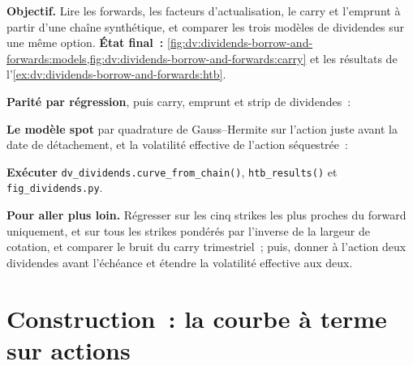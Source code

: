 \begin{tutorial}
\textbf{Objectif.} Lire les forwards, les facteurs d'actualisation, le carry et l'emprunt à partir d'une chaîne
synthétique, et comparer les trois modèles de dividendes sur une même option. \textbf{État final~:}
\cref{fig:dv:dividends-borrow-and-forwards:models,fig:dv:dividends-borrow-and-forwards:carry}
et les résultats de l'\cref{ex:dv:dividends-borrow-and-forwards:htb}.
\begin{tutsteps}
\item \textbf{Parité par régression}, puis carry, emprunt et strip de dividendes~:
\label{lst:dv:dividends-borrow-and-forwards:parity}
\item \textbf{Le modèle spot} par quadrature de Gauss--Hermite sur l'action juste avant la
date de détachement, et la volatilité effective de l'action séquestrée~:
\label{lst:dv:dividends-borrow-and-forwards:spot}
\item \textbf{Exécuter} \texttt{dv\_dividends.curve\_from\_chain()},
\texttt{htb\_results()} et \texttt{fig\_dividends.py}.
\end{tutsteps}
\textbf{Pour aller plus loin.} Régresser sur les cinq strikes les plus proches du forward uniquement, et
sur tous les strikes pondérés par l'inverse de la largeur de cotation, et comparer le bruit du carry
trimestriel~; puis, donner à l'action deux dividendes avant l'échéance et étendre la volatilité
effective aux deux.
\end{tutorial}

\section{Construction~: la courbe à terme sur actions}\label{bld:dv:dividends-borrow-and-forwards:divfwd}

